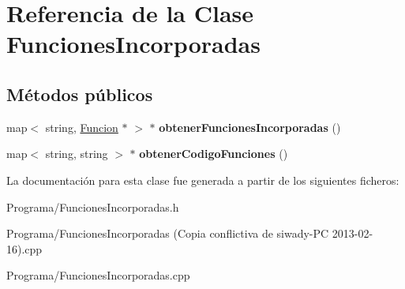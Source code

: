 \hypertarget{class_funciones_incorporadas}{\section{Referencia de la Clase Funciones\-Incorporadas}
\label{class_funciones_incorporadas}
}
\subsection*{Métodos públicos}
\begin{DoxyCompactItemize}
\item 
\hypertarget{class_funciones_incorporadas_a7377645093c2d5bb19674897ced60570}{map$<$ string, \hyperlink{class_funcion}{Funcion} $\ast$ $>$ $\ast$ {\bfseries obtener\-Funciones\-Incorporadas} ()}\label{class_funciones_incorporadas_a7377645093c2d5bb19674897ced60570}

\item 
\hypertarget{class_funciones_incorporadas_a724b8dc70b2d0d4eb051578cadc3f0ca}{map$<$ string, string $>$ $\ast$ {\bfseries obtener\-Codigo\-Funciones} ()}\label{class_funciones_incorporadas_a724b8dc70b2d0d4eb051578cadc3f0ca}

\end{DoxyCompactItemize}


La documentación para esta clase fue generada a partir de los siguientes ficheros\-:\begin{DoxyCompactItemize}
\item 
Programa/Funciones\-Incorporadas.\-h\item 
Programa/Funciones\-Incorporadas (\-Copia conflictiva de siwady-\/\-P\-C 2013-\/02-\/16).\-cpp\item 
Programa/Funciones\-Incorporadas.\-cpp\end{DoxyCompactItemize}
